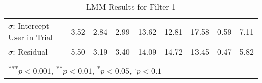 {\begin{landscape}
\begin{table}
\begin{center}
\begin{tabular}{l D{.}{.}{5.5} @{}D{.}{.}{5.5} @{}D{.}{.}{5.5} @{}D{.}{.}{5.5} @{}D{.}{.}{5.5} @{}D{.}{.}{5.5} @{}D{.}{.}{4.5}@{}D{.}{.}{4.5} @{}}
$\sigma$: Intercept User in Trial &   3.52     &     2.84    &      2.99 &13.62&  12.81     &    17.58   &   0.59  & 7.11 \\
$\sigma$: Residual         &     5.50   &    3.19   &    3.40    &       14.09&   14.72    &    13.45   & 0.47& 5.82\\
\bottomrule
\vspace{-3mm}\\
\end{tabular}
\caption{LMM-Results for Filter 1}
\label{table:coefficients}
\end{center}
\end{table}
\end{landscape}}
%
